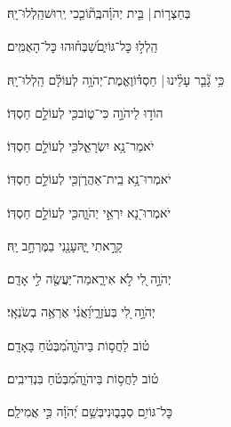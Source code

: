 \documentclass[12pt]{article}
\newcommand{\loc}[1]{\textsuperscript{\locf{#1}}}
\begin{document}
{\loc{ יט}~}‏בְּחַצְר֤וֹת | {\hfill}בֵּ֤ית יְהֹוָ֗ה\newline\hspace*{.5em}בְּֽת֘וֹכֵ֤כִי יְֽרוּשׁ{\hfill}הַֽלְלוּ־יָֽהּ׃\par\pend
\ledpb
\pstart[\subsection*{\textcolor{red}{פרק קיז}}]\label{פרק קיז}
{\loc{ א}~}‏הַֽלְל֣וּ  כׇּל־גּוֹיִ֑ם{\hfill}שַׁ֝בְּח֗וּהוּ כׇּל־הָאֻמִּֽים׃\par

{\loc{ ב}~}‏כִּ֥י גָ֘בַ֤ר עָלֵ֨ינוּ |  חַסְדּ֗וֹ{\hfill}וֶאֱמֶת־יְהֹוָ֥ה לְעוֹלָ֗ם הַֽלְלוּ־יָֽהּ׃\par\pend
\ledpb
\pstart[\subsection*{\textcolor{red}{פרק קיח}}]\label{פרק קיח}
{\loc{ א}~}‏הוֹד֣וּ לַיהֹוָ֣ה כִּי־ט֑וֹב{\hfill}כִּ֖י לְעוֹלָ֣ם חַסְדּֽוֹ׃\par

{\loc{ ב}~}‏יֹאמַר־נָ֥א יִשְׂרָאֵ֑ל{\hfill}כִּ֖י לְעוֹלָ֣ם חַסְדּֽוֹ׃\par

{\loc{ ג}~}‏יֹאמְרוּ־נָ֥א בֵֽית־אַהֲרֹ֑ן{\hfill}כִּ֖י לְעוֹלָ֣ם חַסְדּֽוֹ׃\par

{\loc{ ד}~}‏יֹאמְרוּ־נָ֭א יִרְאֵ֣י יְהֹוָ֑ה{\hfill}כִּ֖י לְעוֹלָ֣ם חַסְדּֽוֹ׃\par

{\loc{ ה}~}‏ קָרָ֣אתִי יָּ֑הּ{\hfill}עָנָ֖נִי בַמֶּרְחָ֣ב יָֽהּ׃\par

{\loc{ ו}~}‏יְהֹוָ֣ה לִ֭י לֹ֣א אִירָ֑א{\hfill}מַה־יַּעֲשֶׂ֖ה לִ֣י אָדָֽם׃\par

{\loc{ ז}~}‏יְהֹוָ֣ה לִ֭י בְּעֹזְרָ֑י{\hfill}וַ֝אֲנִ֗י אֶרְאֶ֥ה בְשֹׂנְאָֽי׃\par

{\loc{ ח}~}‏ט֗וֹב לַחֲס֥וֹת בַּיהֹוָ֑ה{\hfill}מִ֝בְּטֹ֗חַ בָּאָדָֽם׃\par

{\loc{ ט}~}‏ט֗וֹב לַחֲס֥וֹת בַּיהֹוָ֑ה{\hfill}מִ֝בְּטֹ֗חַ בִּנְדִיבִֽים׃\par

{\loc{ י}~}‏כׇּל־גּוֹיִ֥ם סְבָב֑וּנִי{\hfill}בְּשֵׁ֥ם יְ֝הֹוָ֗ה כִּ֣י אֲמִילַֽם׃\par
\end{document}
